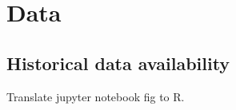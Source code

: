 
\section{Data}%
\label{app:data}


\subsection{Historical data availability}%
\label{sub:historical_data_availability}

Translate jupyter notebook fig to R.



